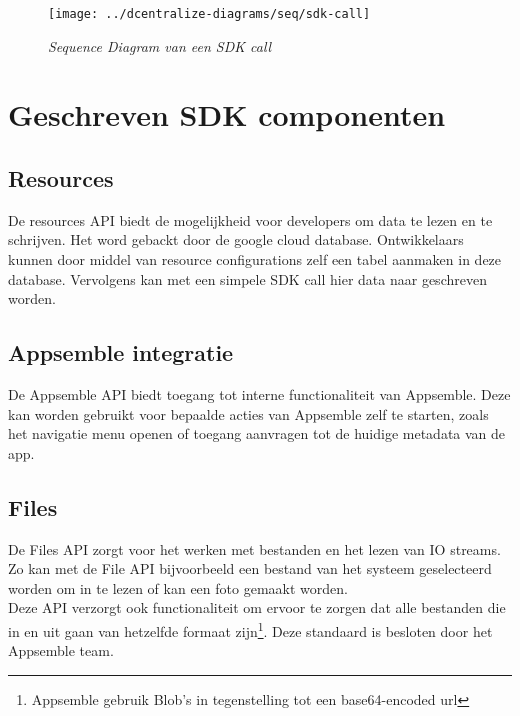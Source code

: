 \begin{figure}
	\centering
	\texttt{[image: ../dcentralize-diagrams/seq/sdk-call]}
	\caption{\textit{Sequence Diagram van een SDK call}}
	\label{fig:SDK-call}
\end{figure}

\section{Geschreven SDK componenten}

\subsection{Resources}

De resources API biedt de mogelijkheid voor developers om data te lezen en te schrijven. Het word gebackt door de google cloud database. Ontwikkelaars kunnen door middel van resource configurations zelf een tabel aanmaken in deze database. Vervolgens kan met een simpele SDK call hier data naar geschreven worden.

\subsection{Appsemble integratie}

De Appsemble API biedt toegang tot interne functionaliteit van Appsemble. Deze kan worden gebruikt voor bepaalde acties van Appsemble zelf te starten, zoals het navigatie menu openen of toegang aanvragen tot de huidige metadata van de app.

\subsection{Files}

De Files API zorgt voor het werken met bestanden en het lezen van IO streams. Zo kan met de File API bijvoorbeeld een bestand van het systeem geselecteerd worden om in te lezen of kan een foto gemaakt worden. \\

Deze API verzorgt ook functionaliteit om ervoor te zorgen dat alle bestanden die in en uit gaan van hetzelfde formaat zijn\footnote{Appsemble gebruik Blob's in tegenstelling tot een base64-encoded url}. Deze standaard is besloten door het Appsemble team.